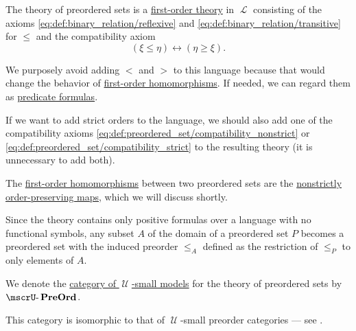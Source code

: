\begin{definition}
\begin{thmenum}
    The theory of preordered sets is a \hyperref[def:first_order_theory]{first-order theory} in \( \mscrL \) consisting of the axioms \eqref{eq:def:binary_relation/reflexive} and \eqref{eq:def:binary_relation/transitive} for \( \leq \) and the compatibility axiom
    \begin{equation}\label{eq:def:preordered_set/theory}
      (\xi \leq \eta) \leftrightarrow (\eta \geq \xi).
    \end{equation}

    We purposely avoid adding \( < \) and \( > \) to this language because that would change the behavior of \hyperref[def:first_order_homomorphism]{first-order homomorphisms}. If needed, we can regard them as \hyperref[rem:predicate_formula]{predicate formulas}.

    If we want to add strict orders to the language, we should also add one of the compatibility axioms \eqref{eq:def:preordered_set/compatibility_nonstrict} or \eqref{eq:def:preordered_set/compatibility_strict} to the resulting theory (it is unnecessary to add both).

     The \hyperref[def:first_order_homomorphism]{first-order homomorphisms} between two preordered sets are the \hyperref[def:order_homomorphism/increasing]{nonstrictly order-preserving maps}, which we will discuss shortly.

     Since the theory contains only positive formulas over a language with no functional symbols, any subset \( A \) of the domain of a preordered set \( P \) becomes a preordered set with the induced preorder \( \leq_A \) defined as the restriction of \( \leq_P \) to only elements of \( A \).

      We denote the \hyperref[def:category_of_small_first_order_models]{category of \( \mscrU \)-small models} for the theory of preordered sets by \( \ucat{PreOrd} \).

    This category is isomorphic to that of \( \mscrU \)-small preorder categories --- see .
  \end{thmenum}
\end{definition}

